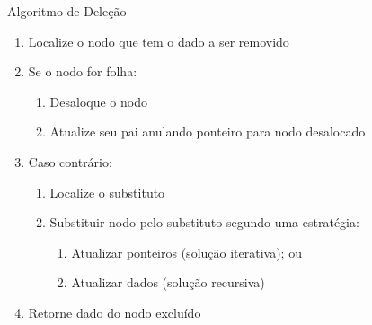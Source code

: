 \documentclass[12pt,table,xcolor={dvipsnames}]{beamer}
\begin{document}
\begin{frame}[fragile]{Algoritmo de Deleção}
	\begin{enumerate}
		\item Localize o nodo que tem o dado a ser removido
		\item Se o nodo for folha:
		\begin{enumerate}
			\item Desaloque o nodo
			\item Atualize seu pai anulando ponteiro para nodo desalocado
		\end{enumerate}
		\item Caso contrário:
		\begin{enumerate}
			\item Localize o substituto
			\item Substituir nodo pelo substituto segundo uma estratégia:
			\begin{enumerate}
			\item Atualizar ponteiros (solução iterativa); ou
			\item Atualizar dados (solução recursiva)
			\end{enumerate}
		\end{enumerate}
			\item Retorne dado do nodo excluído
	\end{enumerate}
\end{frame}
\end{document}
